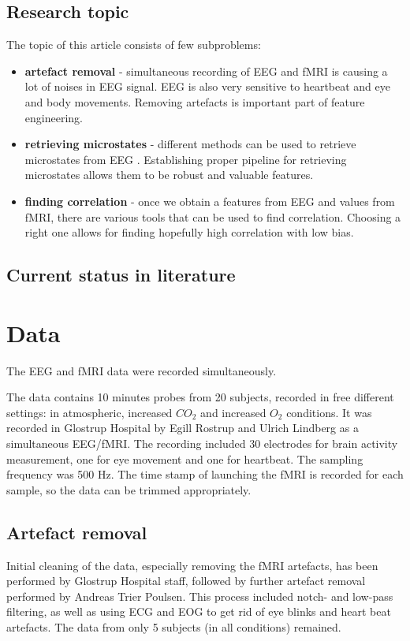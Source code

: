 \documentclass{article}
\begin{document}
\subsection{Research topic}
The topic of this article consists of few subproblems: 
\begin{itemize}
\item \textbf{artefact removal} - simultaneous recording of EEG and fMRI is causing a lot of noises in EEG signal. EEG is also very sensitive to heartbeat and eye and body movements. Removing artefacts is important part of feature engineering. 
\item \textbf{retrieving microstates} - different methods can be used to retrieve microstates from EEG \cite{Khanna2015105}. Establishing proper pipeline for retrieving microstates allows them to be robust and valuable features. 
\item \textbf{finding correlation} - once we obtain a features from EEG and values from fMRI, there are various tools that can be used to find correlation. Choosing a right one allows for finding hopefully high correlation with low bias. 
\end{itemize}
\subsection{Current status in literature}
\section{Data}
\label{sec:data}
The EEG and fMRI data were recorded simultaneously. 

The data contains 10 minutes probes from 20 subjects, recorded in free different settings: in atmospheric, increased $CO_2$ and increased $O_2$ conditions. It was recorded in Glostrup Hospital by Egill Rostrup and Ulrich Lindberg as a simultaneous EEG/fMRI. The recording included 30 electrodes for brain activity measurement, one for eye movement and one for heartbeat. The sampling frequency was 500 Hz. The time stamp of launching the fMRI is recorded for each sample, so the data can be trimmed appropriately.
\subsection{Artefact removal}
Initial cleaning of the data, especially removing the fMRI artefacts, has been performed by Glostrup Hospital staff, followed by further artefact removal performed by Andreas Trier Poulsen. This process included notch- and low-pass filtering, as well as using ECG and EOG to get rid of eye blinks and heart beat artefacts. 
The data from only 5 subjects (in all conditions) remained.
\end{document}

